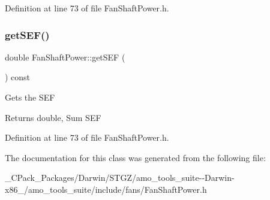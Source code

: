 Definition at line 73 of file Fan\+Shaft\+Power.\+h.

\mbox{\label{class_fan_shaft_power_a7a36d22c2301d3c634fc89e103daa148}} 
\subsubsection{\texorpdfstring{get\+S\+E\+F()}{getSEF()}\hspace{0.1cm}{\footnotesize\ttfamily [3/3]}}
{\footnotesize\ttfamily double Fan\+Shaft\+Power\+::get\+S\+EF (\begin{DoxyParamCaption}{ }\end{DoxyParamCaption}) const\hspace{0.3cm}{\ttfamily [inline]}}

Gets the S\+EF

\begin{DoxyReturn}{Returns}
double, Sum S\+EF 
\end{DoxyReturn}


Definition at line 73 of file Fan\+Shaft\+Power.\+h.



The documentation for this class was generated from the following file\+:\begin{DoxyCompactItemize}
\item 
\+\_\+\+C\+Pack\+\_\+\+Packages/\+Darwin/\+S\+T\+G\+Z/amo\+\_\+tools\+\_\+suite-\/-\/\+Darwin-\/x86\+\_/amo\+\_\+tools\+\_\+suite/include/fans/Fan\+Shaft\+Power.\+h\end{DoxyCompactItemize}

